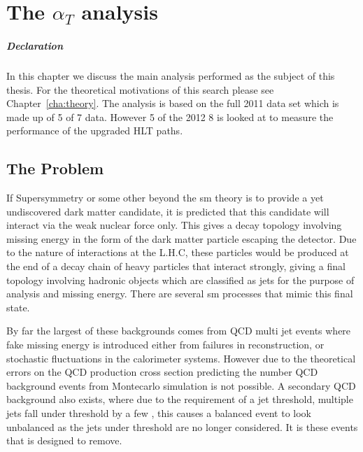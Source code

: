 \chapter{The $\alpha_{T}$ analysis} %
\label{cha:the_t_analysis}
\paragraph{Declaration} %
\label{par:declaration}


In this chapter we discuss the main analysis performed as the subject of this 
thesis. For the theoretical motivations of this search please see 
Chapter~\ref{cha:theory}. The analysis is based on the full 2011 data set which is made up of \unit{5}{\invfb} of \unit{7}{\TeV} data. However \unit{5}{\invfb} of the 2012 \unit{8}{\TeV} is looked at to measure the performance of the upgraded \alt HLT paths.
\section{The Problem} %
\label{sec:the_problem}
If Supersymmetry or some other beyond the \ac{sm} theory is to provide a 
yet undiscovered dark matter candidate, it is predicted that this candidate 
will interact via the weak nuclear force only. This gives a decay topology 
involving missing energy in the form of the dark matter particle escaping the 
detector. Due to the nature of interactions at the L.H.C, these particles would 
be produced at the end of a decay chain of heavy particles that interact 
strongly, giving a final topology involving hadronic objects which are 
classified as jets for the purpose of analysis and missing energy.
There are several \ac{sm} processes that mimic this final state.

By far the largest of these backgrounds comes from QCD multi jet events where 
fake missing energy is introduced either from failures in reconstruction, or 
stochastic fluctuations in the calorimeter systems.
However due to the theoretical errors on the QCD production cross section 
predicting the number QCD background events from Montecarlo simulation is not 
possible.
A secondary QCD background also exists, where due to the requirement of a jet 
\ET threshold, multiple jets fall under threshold by a few \GeV, this causes a 
balanced event to look unbalanced as the jets under threshold are no longer 
considered. It is these events that \alt is designed to remove.

